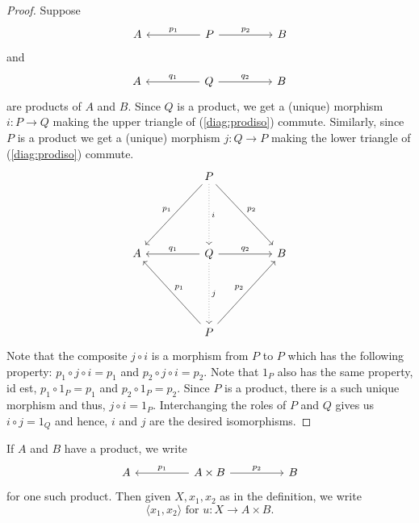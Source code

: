 \documentclass[11pt,leqno,landscape,semhelv]{seminar}
\numberwithin{equation}{section}
\theoremstyle{definition}
\numberwithin{thm}{section}
\numberwithin{equation}{section}
\begin{document}
\begin{proof}
	Suppose
	\begin{equation*} 
		\begin{tikzcd}
			A && P \arrow[ll, "p_1"'] \arrow[rr, "p_2"] && B
		\end{tikzcd}
	\end{equation*}
	and
	\begin{equation*} 
		\begin{tikzcd}
			A && Q \arrow[ll, "q_1"'] \arrow[rr, "q_2"] && B
		\end{tikzcd}
	\end{equation*}
	are products of $A$ and $B.$ Since $Q$ is a product, we get a (unique) morphism $i:P \to Q$ making the upper triangle of (\ref{diag:prodiso}) commute. Similarly, since $P$ is a product we get a (unique) morphism $j:Q\to P$ making the lower triangle of (\ref{diag:prodiso}) commute.
	\begin{equation} \label{diag:prodiso}
		\begin{tikzcd}
			&& P \arrow[llddd, "p_1"'] \arrow[rrddd, "p_2"] \arrow[ddd, dotted, "i"] &&\\
			&&&&\\&&&&\\
			A && Q \arrow[ll, "q_1"'] \arrow[rr, "q_2"] \arrow[ddd, dotted, "j"] && B\\
			&&&&\\&&&&\\
			&& P \arrow[lluuu, "p_1"'] \arrow[rruuu, "p_2"] &&
		\end{tikzcd}
	\end{equation}
	Note that the composite $j\circ i$ is a morphism from $P$ to $P$ which has the following property: $p_1 \circ j \circ i = p_1$ and $p_2 \circ j \circ i = p_2.$ Note that $1_P$ also has the same property, id est, $p_1 \circ 1_P = p_1$ and $p_2 \circ 1_P = p_2.$ Since $P$ is a product, there is a such unique morphism and thus, $j\circ i = 1_P.$ Interchanging the roles of $P$ and $Q$ gives us $i \circ j = 1_Q$ and hence, $i$ and $j$ are the desired isomorphisms.
\end{proof}
If $A$ and $B$ have a product, we write
\begin{equation} 
	\begin{tikzcd}
		A && A \times B \arrow[ll, "p_1"'] \arrow[rr, "p_2"] && B
	\end{tikzcd}
\end{equation}
for one such product. Then given $X, x_1, x_2$ as in the definition, we write
\begin{equation*} 
	\langle x_1, x_2\rangle \text{ for } u:X\to A\times B.
\end{equation*}
\end{document}
